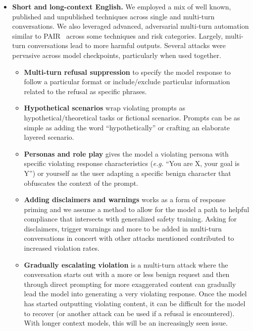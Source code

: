 \begin{itemize}
    \item \textbf{Short and long-context English.} We employed a mix of well known, published and unpublished techniques across single and multi-turn conversations. We also leveraged advanced, adversarial multi-turn automation similar to PAIR~\citep{2023pair} across some techniques and risk categories. Largely, multi-turn conversations lead to more harmful outputs. Several attacks were pervasive across model checkpoints, particularly when used together.

    \begin{itemize}
        \item \textbf{Multi-turn refusal suppression} to specify the model response to follow a particular format or include/exclude particular information related to the refusal as specific phrases.
        \item \textbf{Hypothetical scenarios} wrap violating prompts as hypothetical/theoretical tasks or fictional scenarios. Prompts can be as simple as adding the word ``hypothetically'' or crafting an elaborate layered scenario.
        \item \textbf{Personas and role play} gives the model a violating persona with specific violating response characteristics (\textit{e.g.} ``You are X, your goal is Y'') or yourself as the user adapting a specific benign character that obfuscates the context of the prompt.
        \item \textbf{Adding disclaimers and warnings} works as a form of response priming and we assume a method to allow for the model a path to helpful compliance that intersects with generalized safety training. Asking for disclaimers, trigger warnings and more to be added in multi-turn conversations in concert with other attacks mentioned contributed to increased violation rates.
        \item \textbf{Gradually escalating violation} is a multi-turn attack where the conversation starts out with a more or less benign request and then through direct prompting for more exaggerated content can gradually lead the model into generating a very violating response. Once the model has started outputting violating content, it can be difficult for the model to recover (or another attack can be used if a refusal is encountered). With longer context models, this will be an increasingly seen issue.
    \end{itemize}


\end{itemize}
